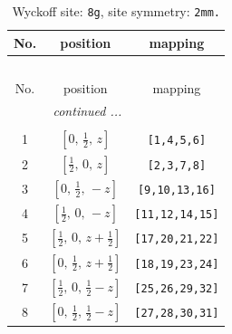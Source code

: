 \documentclass[fleqn,8pt]{jsarticle}
\begin{document}
\begin{longtable}{ccc}
\caption{Wyckoff site: {\tt 8g}, site symmetry: {\tt 2mm.}}
 \\
 \hline \hline
No. & position & mapping \\ \hline \endfirsthead

\multicolumn{2}{l}{\tablename\ \thetable{}} \\
 \hline \hline
No. & position & mapping \\ \hline \endhead

 \hline \hline
\multicolumn{2}{r}{\footnotesize\it continued ...} \\ \endfoot

 \hline \hline
\multicolumn{2}{r}{} \\ \endlastfoot

1 & $\left[ 0,\, \frac{1}{2},\, z \right]$ & {\tt [1,4,5,6]} \\ \hline
2 & $\left[ \frac{1}{2},\, 0,\, z \right]$ & {\tt [2,3,7,8]} \\ \hline
3 & $\left[ 0,\, \frac{1}{2},\, - z \right]$ & {\tt [9,10,13,16]} \\ \hline
4 & $\left[ \frac{1}{2},\, 0,\, - z \right]$ & {\tt [11,12,14,15]} \\ \hline
5 & $\left[ \frac{1}{2},\, 0,\, z + \frac{1}{2} \right]$ & {\tt [17,20,21,22]} \\ \hline
6 & $\left[ 0,\, \frac{1}{2},\, z + \frac{1}{2} \right]$ & {\tt [18,19,23,24]} \\ \hline
7 & $\left[ \frac{1}{2},\, 0,\, \frac{1}{2} - z \right]$ & {\tt [25,26,29,32]} \\ \hline
8 & $\left[ 0,\, \frac{1}{2},\, \frac{1}{2} - z \right]$ & {\tt [27,28,30,31]} \\
\end{longtable}
\renewcommand{\arraystretch}{1.2}
\end{document}
